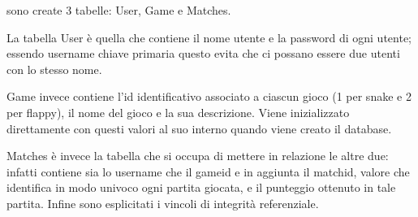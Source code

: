 \documentclass{article}
\begin{document}
sono create 3 tabelle: User, Game e Matches.

La tabella User è quella che contiene il nome utente e la password di ogni utente; essendo username chiave primaria questo evita che ci possano essere due utenti con lo stesso nome.

Game invece contiene l’id identificativo associato a ciascun gioco (1 per snake e 2 per flappy), il nome del gioco e la sua descrizione. 
Viene inizializzato direttamente con questi valori al suo interno quando viene creato il database.

Matches è invece la tabella che si occupa di mettere in relazione le altre due: infatti contiene sia lo username che il game\textunderscore id e in aggiunta il match\textunderscore id, valore che identifica in modo univoco ogni partita giocata, e il punteggio ottenuto in tale partita. 
Infine sono esplicitati i vincoli di integrità referenziale.
\end{document}
